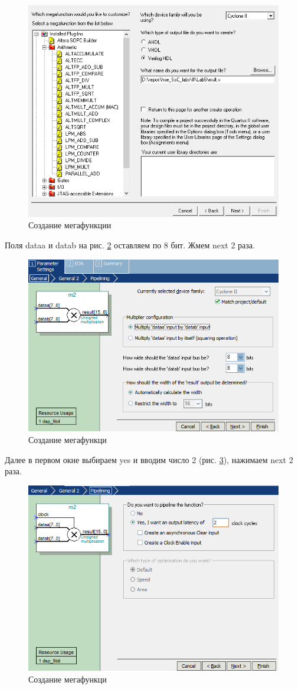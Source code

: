 \documentclass[a4paper,14pt]{article}
\begin{document}
\begin{figure}[H]
	\centering
	\includegraphics[width=0.7\linewidth]{image/lab5/Screenshot_412}
	\caption{Создание мегафункции}
	\label{fig:screenshot412}
\end{figure}

Поля dataa и datab на рис. \ref{fig:screenshot002} оставляем по 8 бит. Жмем next 2 раза.

\begin{figure}[H]
	\centering
	\includegraphics[width=0.7\linewidth]{image/lab5/screenshot002}
	\caption{Создание мегафункци}
	\label{fig:screenshot002}
\end{figure}

Далее в первом окне выбираем yes и вводим число 2 (рис. \ref{fig:screenshot003}), нажимаем next 2 раза.

\begin{figure}[H]
	\centering
	\includegraphics[width=0.7\linewidth]{image/lab5/screenshot003}
	\caption{Создание мегафункци}
	\label{fig:screenshot003}
\end{figure}
\end{document}
